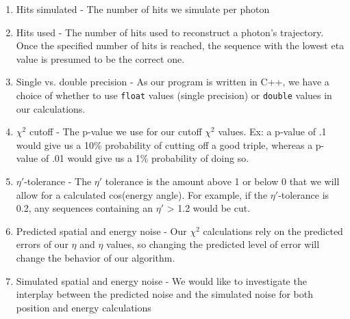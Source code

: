 \begin{enumerate}
    \item Hits simulated - The number of hits we simulate per photon
    \item Hits used - The number of hits used to reconstruct a photon's trajectory. Once the specified number of hits is reached, the sequence with the lowest eta value is presumed to be the correct one.
    \item Single vs. double precision - As our program is written in C++, we have a choice of whether to use \texttt{float} values (single precision) or \texttt{double} values in our calculations.
    \item $\chi^2$ cutoff - The p-value we use for our cutoff $\chi^2$ values. Ex: a p-value of .1 would give us a 10\% probability of cutting off a good triple, whereas a p-value of .01 would give us a 1\% probability of doing so.
    \item $\eta'$-tolerance - The $\eta'$ tolerance is the amount above 1 or below 0 that we will allow for a calculated cos(energy angle). For example, if the $\eta'$-tolerance is 0.2, any sequences containing an $\eta'$ > 1.2 would be cut.
    \item Predicted spatial and energy noise - Our $\chi^2$ calculations rely on the predicted errors of our $\eta$ and $\eta$ values, so changing the predicted level of error will change the behavior of our algorithm.
    \item Simulated spatial and energy noise - We would like to investigate the interplay between the predicted noise and the simulated noise for both position and energy calculations
\end{enumerate}